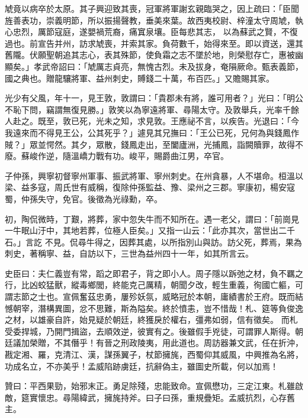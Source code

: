 \begin{pinyinscope}
 虓竟以病卒於太原。其子興迎致其喪，冠軍將軍謝玄親臨哭之，因上疏曰：「臣聞旌善表功，崇義明節，所以振揚聲教，垂美來葉。故西夷校尉、梓潼太守周虓，執心忠烈，厲節寇庭，遂嬰禍荒裔，痛窴泉壤。臣每悲其志，
 以為蘇武之賢，不復過也。前宣告并州，訪求虓喪，并索其家。負荷數千，始得來至。即以資送，還其舊隴。伏願聖朝追其志心，表其殊節，使負霜之志不墜於地，則榮慰存亡，惠被幽顯矣。」孝武帝詔曰：「虓厲志貞亮，無愧古烈。未及拔身，奄隕厥命。甄表義節，國之典也。贈龍驤將軍、益州刺史，賻錢二十萬，布百匹。」又贍賜其家。



 光少有父風，年十一，見王敦，敦謂曰：「貴郡未有將，誰可用者？」光曰：「明公不恥下問，竊謂無復見勝。」敦笑以為寧遠將軍、尋陽太守。及敦舉兵，光率千餘人赴之。既至，敦已死，光未之知，求見敦。王應祕不言，以疾告。光退曰：「今
 我遠來而不得見王公，公其死乎？」遽見其兄撫曰：「王公已死，兄何為與錢鳳作賊？」眾並愕然。其夕，眾散，錢鳳走出，至闔廬洲，光捕鳳，詣闕贖罪，故得不廢。蘇峻作逆，隨溫嶠力戰有功。峻平，賜爵曲江男，卒官。



 子仲孫，興寧初督寧州軍事、振武將軍、寧州刺史。在州貪暴，人不堪命。桓溫以梁、益多寇，周氏世有威稱，復除仲孫監益、豫、梁州之三郡。寧康初，楊安寇蜀，仲孫失守，免官。後徵為光祿勳，卒。



 初，陶侃微時，丁艱，將葬，家中忽失牛而不知所在。遇一老父，謂曰：「前崗見一牛眠山汙中，其地若葬，位極人臣矣。」又指一山云：「此亦其次，當世出二千石。」言訖
 不見。侃尋牛得之，因葬其處，以所指別山與訪。訪父死，葬焉，果為刺史，著稱寧、益，自訪以下，三世為益州四十一年，如其所言云。



 史臣曰：夫仁義豈有常，蹈之即君子，背之即小人。周子隱以跅弛之材，負不羈之行，比凶蛟猛獸，縱毒鄉閭，終能克己厲精，朝聞夕改，輕生重義，徇國亡軀，可謂志節之士也。宣佩奮茲忠勇，屢殄妖氛，威略冠於本朝，庸績書於王府。既而結憾朝宰，潛構異圖，忿不思難，斯為隘矣。終於憤恚，豈不惜哉！札、筵等負俊逸之材，以雄豪自許，始見疑於朝廷，終獲戾於權右，彊弗如弱，信有徵矣。
 而札受委捍城，乃開門揖盜，去順效逆，彼實有之。後雖假手兇徒，可謂罪人斯得。朝廷議加榮贈，不其僭乎！有晉之刑政陵夷，用此道也。周訪器兼文武，任在折沖，戡定湘、羅，克清江、漢，謀孫翼子，杖節擁旄，西蜀仰其威風，中興推為名將，功成名立，不亦美乎！孟威陷跡虜廷，抗辭偽主，雖圖史所載，何以加焉！



 贊曰：平西果勁，始邪末正。勇足除殘，忠能致命。宣佩懋功，三定江東。札雖啟敵，筵實懷忠。尋陽緯武，擁旄持斧。曰子曰孫，重規疊矩。孟威抗烈，心存舊主。



\end{pinyinscope}